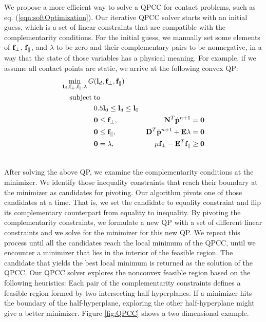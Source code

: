 We propose a more efficient way to solve a QPCC for contact problems, such as eq. (\ref{eqn:softOptimization}). Our iterative QPCC solver starts with an initial guess, which is a set of linear constraints that are compatible with the complementarity conditions. For the initial guess, we manually set some elements of $\mathbf{f}_\perp$, $\mathbf{f}_\parallel$, and $\lambda$ to be zero and their complementary pairs to be nonnegative, in a way that the state of those variables has a physical meaning. For example, if we assume all contact points are static, we arrive at the following convex QP:
\begin{align}
\min_{\mathbf{l}_d,\mathbf{f}_\perp,\mathbf{f}_\parallel,\lambda} G&(\mathbf{l}_d,\mathbf{f}_\perp,\mathbf{f}_\parallel) & \label{eqn:initialGuess} \\
\mathrm{subject\;} &\mathrm{to} & \nonumber\\
 & 0.5\mathbf{l}_0 \leq \mathbf{l}_d \leq \mathbf{l}_0 & \nonumber \\
 & \mathbf{0} \leq \mathbf{f}_\perp, & \mathbf{N}^T\dot{\mathbf{p}}^{n+1} = \mathbf{0} \label{eqn:initialGuess1}\\
 & \mathbf{0} \leq \mathbf{f}_\parallel, &  \mathbf{D}^T \dot{\mathbf{p}}^{n+1} + \mathbf{E} \lambda = \mathbf{0} \label{eqn:initialGuess2}\\
 & \mathbf{0} = \lambda, & \mu \mathbf{f}_\perp - \mathbf{E}^T \mathbf{f}_\parallel \geq \mathbf{0} \label{eqn:initialGuess3} \\
 \nonumber
\end{align}


After solving the above QP, we examine the complementarity conditions
at the minimizer. We identify those inequality constraints that reach
their boundary at the minimizer as candidates for pivoting. Our
algorithm pivots one of those candidates at a time. That is, we set
the candidate to equality constraint and flip its complementary
counterpart from equality to inequality. By pivoting the
complementarity constraints, we formulate a new QP with a set of different
linear constraints and we solve for the minimizer for this new
QP. We repeat this process until all the candidates reach the local
minimum of the QPCC, \ie until we encounter a minimizer that lies in the
interior of the feasible region. The candidate that yields the best
local minimum is returned as the solution of the QPCC. Our QPCC solver
explores the nonconvex feasible region based on the following
heuristics: Each pair of the complementarity constraints defines a
feasible region formed by two intersecting half-hyperplanes. If a minimizer hits the boundary of the half-hyperplane, exploring the other
half-hyperplane might give a better minimizer. Figure \ref{fig:QPCC}
shows a two dimensional example.

